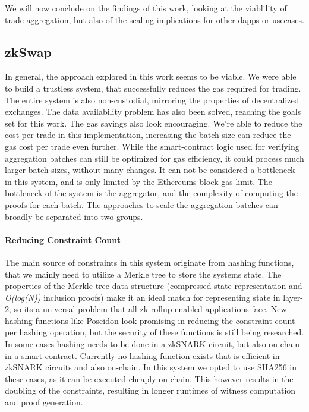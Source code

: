 \documentclass[../../thesis.tex]{subfiles}
\begin{document}
We will now conclude on the findings of this work, looking at the viablility of trade aggregation, but also of the scaling implications for other dapps or usecases. 

\subsection{zkSwap}
In general, the approach explored in this work seems to be viable. We were able to build a trustless system, that successfully reduces the gas required for trading. The entire system is also non-custodial, mirroring the properties of decentralized exchanges. The data availability problem has also been solved, reaching the goals set for this work. The gas savings also look encouraging. We're able to reduce the cost per trade in this implementation, increasing the batch size can reduce the gas cost per trade even further. While the smart-contract logic used for verifying aggregation batches can still be optimized for gas efficiency, it could process much larger batch sizes, without many changes. It can not be considered a bottleneck in this system, and is only limited by the Ethereums block gas limit. The bottleneck of the system is the aggregator, and the complexity of computing the proofs for each batch. The approaches to scale the aggregation batches can broadly be separated into two groups.

\paragraph{Reducing Constraint Count}
The main source of constraints in this system originate from hashing functions, that we mainly need to utilize a Merkle tree to store the systems state. The properties of the Merkle tree data structure (compressed state representation and \textit{O(log(N))} inclusion proofs) make it an ideal match for representing state in layer-2, so its a universal problem that all zk-rollup enabled applications face. New hashing functions like Poseidon look promising in reducing the constraint count per hashing operation, but the security of these functions is still being researched. In some cases hashing needs to be done in a zkSNARK circuit, but also on-chain in a smart-contract. Currently no hashing function exists that is efficient in zkSNARK circuits and also on-chain. In this system we opted to use SHA256 in these cases, as it can be executed cheaply on-chain. This however results in the doubling of the constraints, resulting in longer runtimes of witness computation and proof generation.
\end{document}
